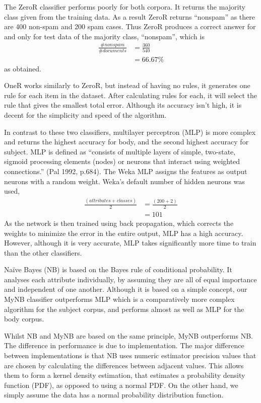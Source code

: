 \documentclass[10pt, a4paper]{article}
\begin{document}
The ZeroR classifier performs poorly for both corpora. It returns the majority class given from the training data. As a result ZeroR returns ``nonspam'' as there are 400 non-spam and 200 spam cases. Thus ZeroR produces a correct answer for and only for test data of the majority class, ``nonspam'', which is 
\begin{align*} \frac{\# nonspam}{\# documents} &=  \frac{360}{540} \\ &= 66.67\% 
\end{align*}
as obtained. 

OneR works similarly to ZeroR, but instead of having no rules, it generates one rule for each item in the dataset. After calculating rules for each, it will select the rule that gives the smallest total error. Although its accuracy isn't high, it is decent for the simplicity and speed of the algorithm.

In contrast to these two classifiers, multilayer perceptron (MLP) is more complex and returns the highest accuracy for body, and the second highest accuracy for subject. MLP is defined as ``consists of multiple layers of simple, two-state, sigmoid processing elements (nodes) or neurons that interact using weighted connections.'' (Pal 1992, p.684). The Weka MLP assigns the features as output neurons with a random weight. Weka's default number of hidden neurons\cite{WekaMLP} was used, 
\begin{align*} \frac{(attributes + classes)}{2} &= \frac{(200+2)}{2} \\&= 101
\end{align*}
As the network is then trained using back propagation, which corrects the weights to minimize the error in the entire output, MLP has a high accuracy. However, although it is very accurate, MLP takes significantly more time to train than the other classifiers. 

Na\"ive Bayes (NB) is based on the Bayes rule of conditional probability. It analyses each attribute individually, by assuming they are all of equal importance and independent of one another. Although it is based on a simple concept, our MyNB classifier outperforms MLP which is a comparatively more complex algorithm for the subject corpus, and performs almost as well as MLP for the body corpus. 

Whilst NB and MyNB are based on the same principle, MyNB outperforms NB. The difference in performance is due to implementation. The major difference between implementations is that NB uses numeric estimator precision values that are chosen by calculating the differences between adjacent values. This allows them to form a kernel density estimation, that estimates a probability density function (PDF), as opposed to using a normal PDF. On the other hand, we simply assume the data has a normal probability distribution function. 
\end{document}
